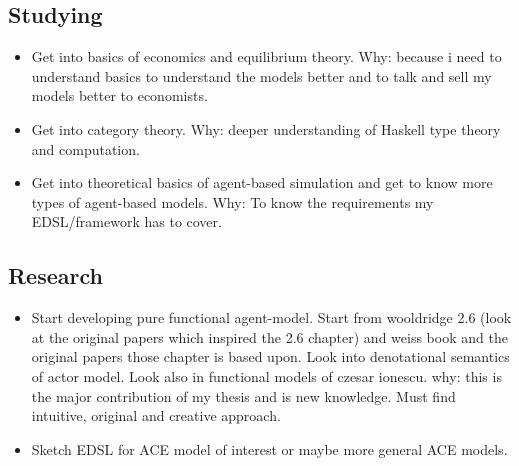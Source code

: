 \documentclass{article}
\begin{document}
\subsection{Studying}
\begin{itemize}
\item Get into basics of economics and equilibrium theory. Why: because i need to understand basics to understand the models better and to talk and sell my models better to economists.
\item Get into category theory. Why: deeper understanding of Haskell type theory and computation.
\item Get into theoretical basics of agent-based simulation and get to know more types of agent-based models. Why: To know the requirements my EDSL/framework has to cover.
\end{itemize}

\subsection{Research}
\begin{itemize}
\item Start developing pure functional agent-model. Start from wooldridge 2.6 (look at the original papers which inspired the 2.6 chapter) and weiss book and the original papers those chapter is based upon. Look into denotational semantics of actor model. Look also in functional models of czesar ionescu. why: this is the major contribution of my thesis and is new knowledge. Must find intuitive, original and creative approach.
\item Sketch EDSL for ACE model of interest or maybe more general ACE models.
\end{itemize}





\end{document}
